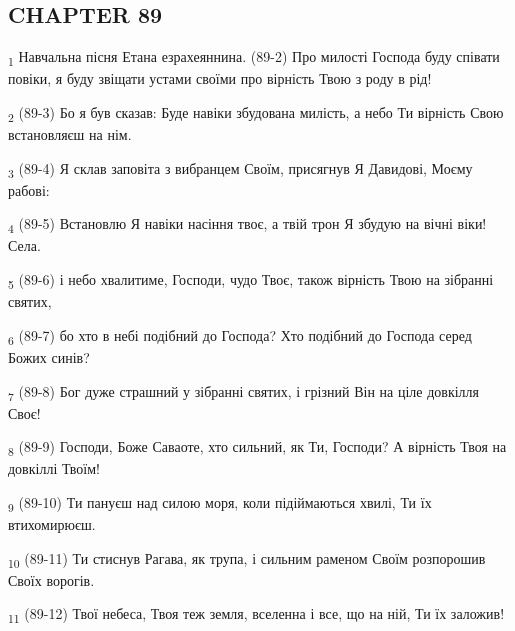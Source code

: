 \subsection{CHAPTER 89}
\begin{tcolorbox}
\textsubscript{1} Навчальна пісня Етана езрахеяннина. (89-2) Про милості Господа буду співати повіки, я буду звіщати устами своїми про вірність Твою з роду в рід!
\end{tcolorbox}
\begin{tcolorbox}
\textsubscript{2} (89-3) Бо я був сказав: Буде навіки збудована милість, а небо Ти вірність Свою встановляєш на нім.
\end{tcolorbox}
\begin{tcolorbox}
\textsubscript{3} (89-4) Я склав заповіта з вибранцем Своїм, присягнув Я Давидові, Моєму рабові:
\end{tcolorbox}
\begin{tcolorbox}
\textsubscript{4} (89-5) Встановлю Я навіки насіння твоє, а твій трон Я збудую на вічні віки! Села.
\end{tcolorbox}
\begin{tcolorbox}
\textsubscript{5} (89-6) і небо хвалитиме, Господи, чудо Твоє, також вірність Твою на зібранні святих,
\end{tcolorbox}
\begin{tcolorbox}
\textsubscript{6} (89-7) бо хто в небі подібний до Господа? Хто подібний до Господа серед Божих синів?
\end{tcolorbox}
\begin{tcolorbox}
\textsubscript{7} (89-8) Бог дуже страшний у зібранні святих, і грізний Він на ціле довкілля Своє!
\end{tcolorbox}
\begin{tcolorbox}
\textsubscript{8} (89-9) Господи, Боже Саваоте, хто сильний, як Ти, Господи? А вірність Твоя на довкіллі Твоїм!
\end{tcolorbox}
\begin{tcolorbox}
\textsubscript{9} (89-10) Ти пануєш над силою моря, коли підіймаються хвилі, Ти їх втихомирюєш.
\end{tcolorbox}
\begin{tcolorbox}
\textsubscript{10} (89-11) Ти стиснув Рагава, як трупа, і сильним раменом Своїм розпорошив Своїх ворогів.
\end{tcolorbox}
\begin{tcolorbox}
\textsubscript{11} (89-12) Твої небеса, Твоя теж земля, вселенна і все, що на ній, Ти їх заложив!
\end{tcolorbox}

